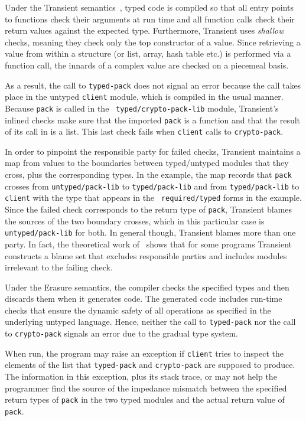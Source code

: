 Under the Transient semantics~\cite{vss-popl-2017}, typed code is compiled so
that all entry points to functions check their arguments at run time and all
function calls check their return values against the expected type.
Furthermore, Transient uses \emph{shallow} checks, meaning they check only the
top constructor of a value. Since retrieving a value from within a structure (or
list, array, hash table etc.) is performed via a function call, the innards of a
complex value are checked on a piecemeal basis.

As a result, the call to \texttt{typed-pack} does not signal an error because
the call takes place in the untyped {\tt client} module, which is compiled in
the usual manner. Because {\tt pack} is called in the {\tt
typed/crypto-pack-lib} module, Transient's inlined checks make sure that the
imported \texttt{pack} is a function and that the result of its call in is a
list. This last check fails when \texttt{client} calls to {\tt crypto-pack}.

In order to pinpoint the responsible party for failed checks, Transient
maintains a map from values to the boundaries between typed/untyped modules that
they cross, plus the corresponding types. In the example, the map records that
\texttt{pack} crosses from \texttt{untyped/pack-lib} to {\tt typed/pack-lib} and
from {\tt typed/pack-lib} to {\tt client} with the type that appears in the {\tt
required/typed} forms in the example. Since the failed check corresponds to the
return type of \texttt{pack}, Transient blames the sources of the two boundary
crosses, which in this particular case is \texttt{untyped/pack-lib} for both. In
general though, Transient blames more than one party. In fact, the theoretical
work of~\citet{gfd-oopsla-2019} shows that for some programs Transient
constructs a blame set that excludes responsible parties and includes modules
irrelevant to the failing check.

Under the Erasure semantics, the compiler checks the specified types and then
discards them when it generates code. The generated code includes run-time
checks that ensure the dynamic safety of all operations as specified in the
underlying untyped language. Hence, neither the call to {\tt typed-pack} nor the
call to {\tt crypto-pack} signals an error due to the gradual type system.

When run, the program may raise an exception if \texttt{client} tries to
inspect the elements of the list that \texttt{typed-pack} and
\texttt{crypto-pack} are supposed to produce. The information in this exception,
plus its stack trace, or may not help the programmer find the source of the
impedance mismatch between the specified return types of {\tt pack} in the two
typed modules and the actual return value of {\tt pack}.

